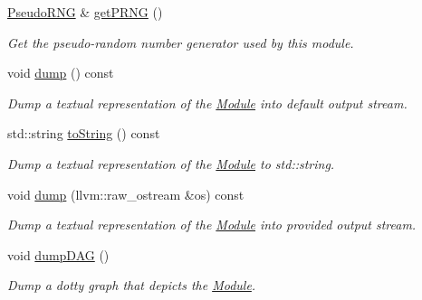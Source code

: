 \begin{DoxyCompactItemize}
\hyperlink{classglow_1_1_pseudo_r_n_g}{Pseudo\+R\+NG} \& \hyperlink{classglow_1_1_module_ae8d51553337a469c1a2951be4ede1a95}{get\+P\+R\+NG} ()
\begin{DoxyCompactList}\small\item\em Get the pseudo-\/random number generator used by this module. \end{DoxyCompactList}\item 
\mbox{\label{classglow_1_1_module_a9b4c67a0936fe59c9511ff591b97f260}} 
void \hyperlink{classglow_1_1_module_a9b4c67a0936fe59c9511ff591b97f260}{dump} () const
\begin{DoxyCompactList}\small\item\em Dump a textual representation of the \hyperlink{classglow_1_1_module}{Module} into default output stream. \end{DoxyCompactList}\item 
\mbox{\label{classglow_1_1_module_ae9f413a5a2d88b97735a71a65ec2ff95}} 
std\+::string \hyperlink{classglow_1_1_module_ae9f413a5a2d88b97735a71a65ec2ff95}{to\+String} () const
\begin{DoxyCompactList}\small\item\em Dump a textual representation of the \hyperlink{classglow_1_1_module}{Module} to std\+::string. \end{DoxyCompactList}\item 
\mbox{\label{classglow_1_1_module_a0ab82591c9e99b30321c4e7f883a1c58}} 
void \hyperlink{classglow_1_1_module_a0ab82591c9e99b30321c4e7f883a1c58}{dump} (llvm\+::raw\+\_\+ostream \&os) const
\begin{DoxyCompactList}\small\item\em Dump a textual representation of the \hyperlink{classglow_1_1_module}{Module} into provided output stream. \end{DoxyCompactList}\item 
\mbox{\label{classglow_1_1_module_ab7df0631737319eda725640b53586df0}} 
void \hyperlink{classglow_1_1_module_ab7df0631737319eda725640b53586df0}{dump\+D\+AG} ()
\begin{DoxyCompactList}\small\item\em Dump a dotty graph that depicts the \hyperlink{classglow_1_1_module}{Module}. \end{DoxyCompactList}\item 

\end{DoxyCompactItemize}
